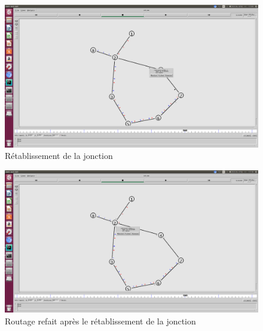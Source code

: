     \begin{figure}
    \centering
    \includegraphics[width=0.99\columnwidth]{./tp2/tp2-1-LS-3-relink.png}
    \caption{Rétablissement de la jonction}
    \end{figure}
    \begin{figure}
    \centering
    \includegraphics[width=0.99\columnwidth]{./tp2/tp2-1-LS-4-relink_triggered.png}
    \caption{Routage refait après le rétablissement de la jonction}
    \end{figure}

